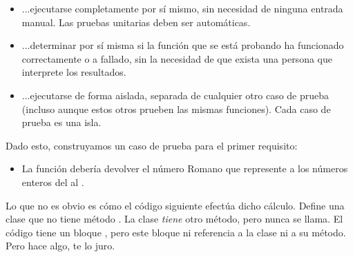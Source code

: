 
\begin{itemize}

\item ...ejecutarse completamente por sí mismo, sin necesidad de ninguna entrada manual. Las pruebas unitarias deben ser automáticas.

\item ...determinar por sí misma si la función que se está probando ha funcionado correctamente o a fallado, sin la necesidad de que exista una persona que interprete los resultados.

\item ...ejecutarse de forma aislada, separada de cualquier otro caso de prueba (incluso aunque estos otros prueben las mismas funciones). Cada caso de prueba es una isla.

\end{itemize}

Dado esto, construyamos un caso de prueba para el primer requisito:

\begin{itemize}

\item La función  debería devolver el número Romano que represente a los números enteros del  al .

\end{itemize}

Lo que no es obvio es cómo el código siguiente efectúa dicho cálculo. Define una clase que no tiene método . La clase \emph{tiene} otro método, pero nunca se llama. El código tiene un bloque , pero este bloque ni referencia a la clase ni a su método. Pero hace algo, te lo juro.

